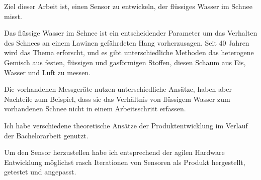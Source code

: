 Ziel dieser Arbeit ist, einen Sensor zu entwickeln, der flüssiges Wasser im Schnee misst.

Das flüssige Wasser im Schnee ist ein entscheidender Parameter um das Verhalten des Schnees an einem Lawinen gefährdeten Hang  vorherzusagen. Seit 40 Jahren wird das Thema erforscht,  und es gibt unterschiedliche Methoden das heterogene Gemisch aus festen, flüssigen und gasförmigen Stoffen, diesen Schaum aus Eis, Wasser und Luft zu messen.

Die vorhandenen Messgeräte nutzen unterschiedliche Ansätze, haben aber Nachteile zum Beispiel, dass sie das Verhältnis von flüssigem Wasser zum vorhandenen Schnee nicht in einem Arbeitsschritt erfassen.

Ich habe verschiedene theoretische Ansätze der Produktentwicklung im Verlauf der Bachelorarbeit genutzt.

Um den Sensor herzustellen habe ich entsprechend der agilen Hardware Entwicklung möglichst rasch Iterationen von Sensoren als Produkt hergestellt, getestet und angepasst.

\iffalse
ziel dieser Arbeit ist die entwicklung eines innovativen sensors um die scheefeuchtigkeit zu messen.

Die schneefeuchtigkeit ist ein entscheidenen Parameter um Gleitschneelawinen abzuschetzten. seit 40 jahren ist wird Thema beforscht. Es gibt verschiedenste Techniken um den Schaum aus Eis, Wasser und Luft zu messen. heutige Produkte konnen den LWC messen, haben aber verschiedene schwerwigeende nachteile.

um dieses Produktentwicklung an zu gehen werden verschiedene techniken der Produktentwicklung eingesetzt. um ein sensor zu erreichen der einsatztfahig ist, wurde nach aglier hardware entwicklung moglichst schnell Itterationen von sensoren entwickelt.

\fi
